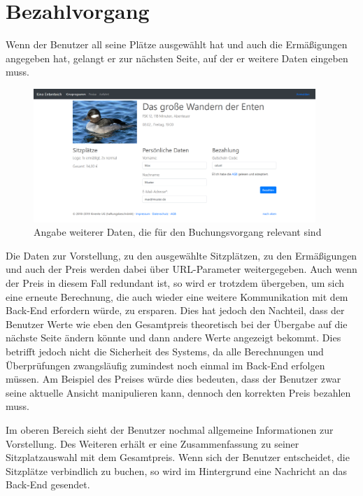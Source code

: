 \section{Bezahlvorgang}

Wenn der Benutzer all seine Plätze ausgewählt hat und auch die Ermäßigungen angegeben hat, gelangt er zur nächsten Seite, auf der er weitere Daten eingeben muss.

\begin{figure}[ht]
	\centering
	\includegraphics[width=0.95\textwidth]{img/screenshots/vorstellung03}
	\captionsetup{format=hang}
	\caption{Angabe weiterer Daten, die für den Buchungsvorgang relevant sind}
	\label{fig:vorstellung03}
\end{figure}

Die Daten zur Vorstellung, zu den ausgewählte Sitzplätzen, zu den Ermäßigungen und auch der Preis werden dabei über \acs{URL}-Parameter weitergegeben.
Auch wenn der Preis in diesem Fall redundant ist, so wird er trotzdem übergeben, um sich eine erneute Berechnung, die auch wieder eine weitere Kommunikation mit dem Back-End erfordern würde, zu ersparen.
Dies hat jedoch den Nachteil, dass der Benutzer Werte wie eben den Gesamtpreis theoretisch bei der Übergabe auf die nächste Seite ändern könnte und dann andere Werte angezeigt bekommt.
Dies betrifft jedoch nicht die Sicherheit des Systems, da alle Berechnungen und Überprüfungen zwangsläufig zumindest noch einmal im Back-End erfolgen müssen.
Am Beispiel des Preises würde dies bedeuten, dass der Benutzer zwar seine aktuelle Ansicht manipulieren kann, dennoch den korrekten Preis bezahlen muss.

Im oberen Bereich sieht der Benutzer nochmal allgemeine Informationen zur Vorstellung.
Des Weiteren erhält er eine Zusammenfassung zu seiner Sitzplatzauswahl mit dem Gesamtpreis.
Wenn sich der Benutzer entscheidet, die Sitzplätze verbindlich zu buchen, so wird im Hintergrund eine Nachricht an das Back-End gesendet.

